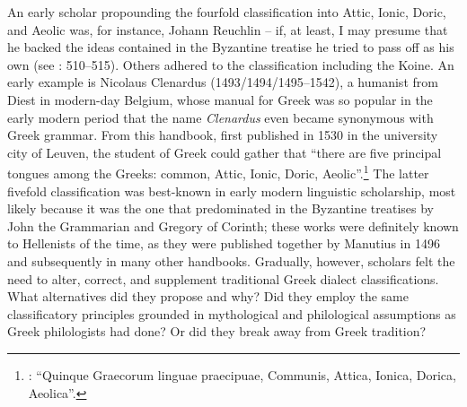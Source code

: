 {An early scholar propounding the fourfold classification into Attic, Ionic, Doric, and Aeolic was, for instance, Johann Reuchlin – if, at least, I may presume that he backed the ideas contained in the Byzantine treatise he tried to pass off as his own (see \citealt{VanRooy2014}: 510–515). Others adhered to the classification including the Koine. An early example is Nicolaus Clenardus (1493/1494/1495–1542), a humanist from Diest in modern-day Belgium, whose manual for Greek was so popular in the early modern period that the name \textit{Clenardus} even became synonymous with Greek grammar. From this handbook, first published in 1530 in the university city of Leuven, the student of Greek could gather that “there are five principal tongues among the Greeks: common, Attic, Ionic, Doric, Aeolic”.\footnote{\citet[7 (misprint for 6)]{Clenardus1530}: “Quinque Graecorum linguae praecipuae, Communis, Attica, Ionica, Dorica, Aeolica”.} The latter fivefold classification was best-known in early modern linguistic scholarship, most likely because it was the one that predominated in the Byzantine treatises by John the Grammarian and Gregory of Corinth; these works were definitely known to Hellenists of the time, as they were published together by Manutius in 1496 and subsequently in many other handbooks. Gradually, however, scholars felt the need to alter, correct, and supplement traditional Greek dialect classifications. What alternatives did they propose and why? Did they employ the same classificatory principles grounded in mythological and philological assumptions as Greek philologists had done? Or did they break away from Greek tradition?

}
